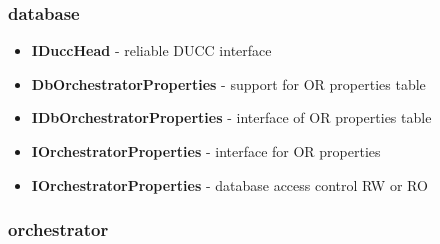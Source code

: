 \documentclass[letterpaper]{article}
\begin{document}
\subsubsection{database}

{\renewcommand\labelitemi{}
\begin{itemize}
  \item \textbf{IDuccHead} - reliable DUCC interface
  \item \textbf{DbOrchestratorProperties} - support for OR properties table
  \item \textbf{IDbOrchestratorProperties} - interface of OR properties table
  \item \textbf{IOrchestratorProperties} - interface for OR properties
  \item \textbf{IOrchestratorProperties} - database access control RW or RO
\end{itemize}
}

\subsubsection{orchestrator}
\end{document}
